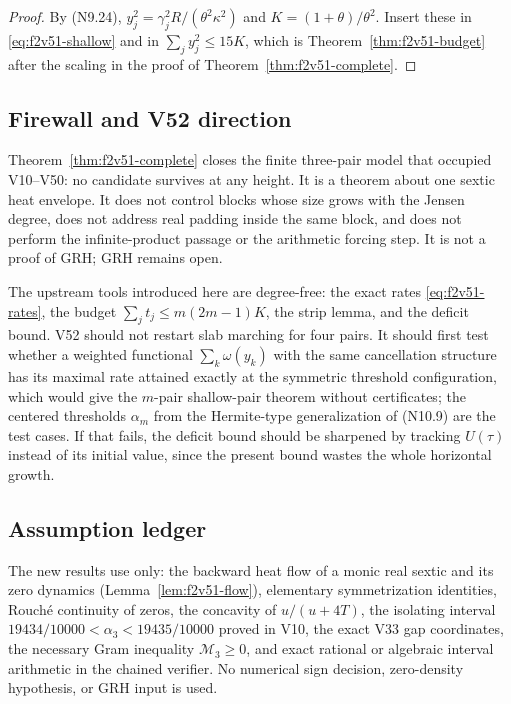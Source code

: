 \documentclass[11pt]{article}
\theoremstyle{definition}
\theoremstyle{remark}
\begin{document}
\begin{proof}
By \textup{(N9.24)}, \(y_j^2=\gamma_j^2R/(\theta^2\kappa^2)\) and
\(K=(1+\theta)/\theta^2\).  Insert these in \eqref{eq:f2v51-shallow} and
in \(\sum_jy_j^2\le15K\), which is Theorem~\ref{thm:f2v51-budget} after
the scaling in the proof of Theorem~\ref{thm:f2v51-complete}.
\end{proof}

\subsection*{Firewall and V52 direction}
\label{fire:f2v51}
Theorem~\ref{thm:f2v51-complete} closes the finite three-pair model that
occupied V10--V50: no candidate survives at any height.  It is a theorem
about one sextic heat envelope.  It does not control blocks whose size
grows with the Jensen degree, does not address real padding inside the
same block, and does not perform the infinite-product passage or the
arithmetic forcing step.  It is not a proof of GRH; GRH remains open.

The upstream tools introduced here are degree-free: the exact rates
\eqref{eq:f2v51-rates}, the budget \(\sum_jt_j\le m(2m-1)K\), the strip
lemma, and the deficit bound.  V52 should not restart slab marching for
four pairs.  It should first test whether a weighted functional
\(\sum_k\omega(y_k)\) with the same cancellation structure has its maximal
rate attained exactly at the symmetric threshold configuration, which
would give the \(m\)-pair shallow-pair theorem without certificates; the
centered thresholds \(\alpha_m\) from the Hermite-type generalization of
\textup{(N10.9)} are the test cases.  If that fails, the deficit bound
should be sharpened by tracking \(U(\tau)\) instead of its initial value,
since the present bound wastes the whole horizontal growth.

\subsection*{Assumption ledger}
\label{ass:f2v51}
The new results use only: the backward heat flow of a monic real sextic
and its zero dynamics (Lemma~\ref{lem:f2v51-flow}), elementary
symmetrization identities, Rouch\'{e} continuity of zeros, the concavity
of \(u/(u+4T)\), the isolating interval \(19434/10000<\alpha_3<19435/10000\)
proved in V10, the exact V33 gap coordinates, the necessary Gram
inequality \(\mathcal M_3\ge0\), and exact rational or algebraic interval
arithmetic in the chained verifier.  No numerical sign decision,
zero-density hypothesis, or GRH input is used.
\endgroup
\end{document}
